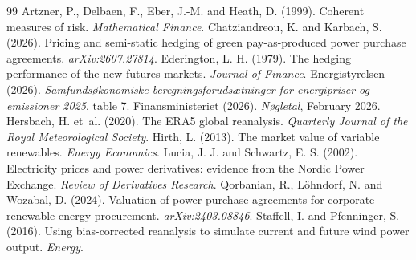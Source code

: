\documentclass[11pt,a4paper]{article}
\begin{document}
\begin{thebibliography}{99}\small
{} Artzner, P., Delbaen, F., Eber, J.-M. and Heath, D. (1999). Coherent measures of risk. \textit{Mathematical Finance}.
 Chatziandreou, K. and Karbach, S. (2026). Pricing and semi-static hedging of green pay-as-produced power purchase agreements. \textit{arXiv:2607.27814}.
 Ederington, L. H. (1979). The hedging performance of the new futures markets. \textit{Journal of Finance}.
 Energistyrelsen (2026). \textit{Samfundsøkonomiske beregningsforudsætninger for energipriser og emissioner 2025}, table 7.
 Finansministeriet (2026). \textit{Nøgletal}, February 2026.
 Hersbach, H. et~al. (2020). The ERA5 global reanalysis. \textit{Quarterly Journal of the Royal Meteorological Society}.
 Hirth, L. (2013). The market value of variable renewables. \textit{Energy Economics}.
 Lucia, J. J. and Schwartz, E. S. (2002). Electricity prices and power derivatives: evidence from the Nordic Power Exchange. \textit{Review of Derivatives Research}.
 Qorbanian, R., Löhndorf, N. and Wozabal, D. (2024). Valuation of power purchase agreements for corporate renewable energy procurement. \textit{arXiv:2403.08846}.
 Staffell, I. and Pfenninger, S. (2016). Using bias-corrected reanalysis to simulate current and future wind power output. \textit{Energy}.
\end{thebibliography}
\end{document}
